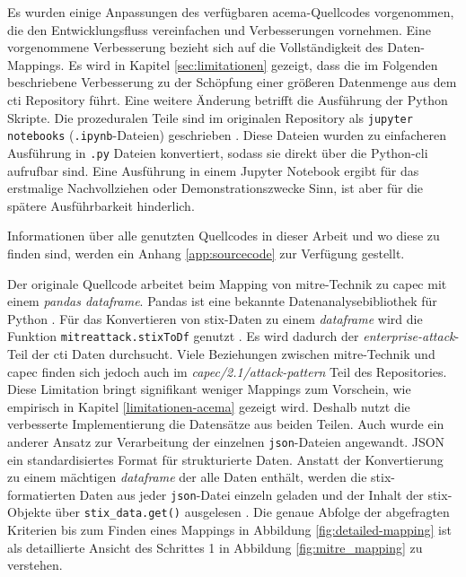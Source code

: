 \par Es wurden einige Anpassungen des verfügbaren \gls{acema}-Quellcodes vorgenommen, die den Entwicklungsfluss vereinfachen und Verbesserungen vornehmen. Eine vorgenommene Verbesserung bezieht sich auf die Vollständigkeit des Daten-Mappings. Es wird in Kapitel \ref{sec:limitationen} gezeigt, dass die im Folgenden beschriebene Verbesserung zu der Schöpfung einer größeren Datenmenge aus dem \gls{cti} Repository führt. Eine weitere Änderung betrifft die Ausführung der Python Skripte. Die prozeduralen Teile sind im originalen Repository als \verb|jupyter notebooks| (\verb|.ipynb|-Dateien) geschrieben \autocite{klement2023acema,ProjectJupyter}. Diese Dateien wurden zu einfacheren Ausführung in \verb|.py| Dateien konvertiert, sodass sie direkt über die Python-\gls{cli} aufrufbar sind. Eine Ausführung in einem Jupyter Notebook ergibt für das erstmalige Nachvollziehen oder Demonstrationszwecke Sinn, ist aber für die spätere Ausführbarkeit hinderlich.
\par Informationen über alle genutzten Quellcodes in dieser Arbeit und wo diese zu finden sind, werden ein Anhang \ref{app:sourcecode} zur Verfügung gestellt.

Der originale Quellcode arbeitet beim Mapping von \gls{mitre}-Technik zu \gls{capec} mit einem \textit{pandas dataframe}. Pandas ist eine bekannte Datenanalysebibliothek für Python \autocite{PandasPythonData}. Für das Konvertieren von \gls{stix}-Daten zu einem \textit{dataframe} wird die Funktion \verb|mitreattack.stixToDf| genutzt \autocite{MitreattackpythonMitreattackAttackToExcel}. Es wird dadurch der \textit{enterprise-attack}-Teil der \gls{cti} Daten durchsucht. Viele Beziehungen zwischen \gls{mitre}-Technik und \gls{capec} finden sich jedoch auch im \textit{capec/2.1/attack-pattern} Teil des Repositories. Diese Limitation bringt signifikant weniger Mappings zum Vorschein, wie empirisch in Kapitel \ref{limitationen-acema} gezeigt wird. Deshalb nutzt die verbesserte Implementierung die Datensätze aus beiden Teilen. Auch wurde ein anderer Ansatz zur Verarbeitung der einzelnen \verb|json|-Dateien angewandt. JSON ein standardisiertes Format für strukturierte Daten. Anstatt der Konvertierung zu einem mächtigen \textit{dataframe} der alle Daten enthält, werden die \gls{stix}-formatierten Daten aus jeder \verb|json|-Datei einzeln geladen und der Inhalt der \gls{stix}-Objekte über \verb|stix_data.get()| ausgelesen \autocite{OasisopenCtipythonstix2OASIS}. Die genaue Abfolge der abgefragten Kriterien bis zum Finden eines Mappings in Abbildung \ref{fig:detailed-mapping} ist als detaillierte Ansicht des Schrittes 1 in Abbildung \ref{fig:mitre_mapping} zu verstehen.

